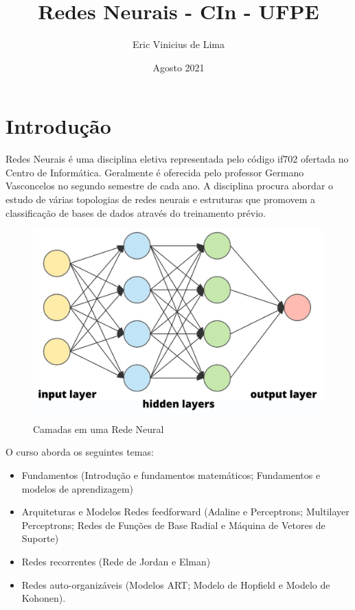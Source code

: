 \documentclass{article}
\title{Redes Neurais - CIn - UFPE}
\author{Eric Vinicius de Lima}
\date{Agosto 2021}
\begin{document}
\maketitle

\section{Introdução}

Redes Neurais é uma disciplina eletiva representada pelo código if702 ofertada no Centro de Informática. Geralmente é oferecida pelo professor Germano Vasconcelos \cite{professor} no segundo semestre de cada ano. A disciplina procura abordar o estudo de várias topologias de redes neurais e estruturas que promovem a classificação de bases de dados através do treinamento prévio. \cite{course}

\begin{figure}[h]
\centering
\includegraphics[scale=0.2]{layers.jpg}
\caption{Camadas em uma Rede Neural \citep{figure1}}
\label{figura_1}
\end{figure}

O curso aborda os seguintes temas:
\begin{itemize}
    \item Fundamentos (Introdução e fundamentos matemáticos; Fundamentos e modelos de aprendizagem) 
    \item Arquiteturas e Modelos Redes feedforward (Adaline e Perceptrons; Multilayer Perceptrons; Redes de Funções de Base Radial e Máquina de Vetores de Suporte) 
    \item Redes recorrentes (Rede de Jordan e Elman) 
    \item Redes auto-organizáveis (Modelos ART;  Modelo de Hopfield e Modelo de Kohonen).
\end{itemize}
\end{document}
